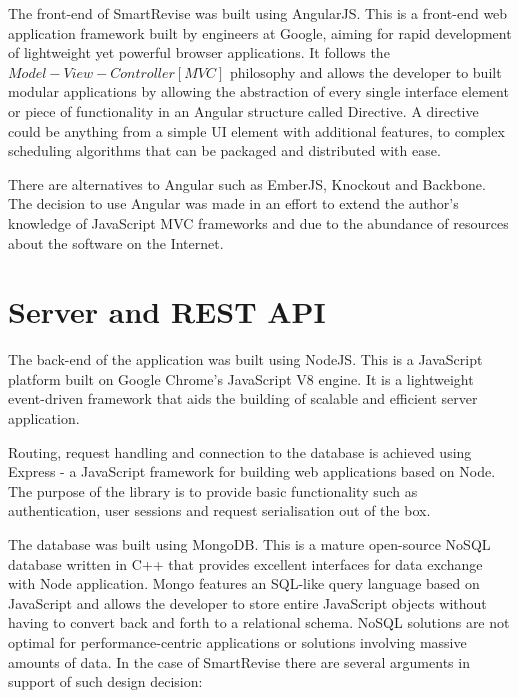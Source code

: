 \documentclass[bsc,frontabs,twoside,singlespacing,parskip]{infthesis}     %
\begin{document}
		The front-end of SmartRevise was built using AngularJS. This is a front-end web application framework built by engineers at Google, aiming for rapid development of lightweight yet powerful browser applications. It follows the $ Model-View-Controller [MVC] $ philosophy and allows the developer to built modular applications by allowing the abstraction of every single interface element or piece of functionality in an Angular structure called Directive. A directive could be anything from a simple UI element with additional features, to complex scheduling algorithms that can be packaged and distributed with ease.

		There are alternatives to Angular such as EmberJS, Knockout and Backbone. The decision to use Angular was made in an effort to extend the author's knowledge of JavaScript MVC frameworks and due to the abundance of resources about the software on the Internet.

	\section{Server and REST API}

		The back-end of the application was built using NodeJS. This is a JavaScript platform built on Google Chrome's JavaScript V8 engine. It is a lightweight event-driven framework that aids the building of scalable and efficient server application.

		Routing, request handling and connection to the database is achieved using Express - a JavaScript framework for building web applications based on Node. The purpose of the library is to provide basic functionality such as authentication, user sessions and request serialisation out of the box.

		The database was built using MongoDB. This is a mature open-source NoSQL database written in C++ that provides excellent interfaces for data exchange with Node application. Mongo features an SQL-like query language based on JavaScript and allows the developer to store entire JavaScript objects without having to convert back and forth to a relational schema. NoSQL solutions are not optimal for performance-centric applications or solutions involving massive amounts of data. In the case of SmartRevise there are several arguments in support of such design decision:
\end{document}
